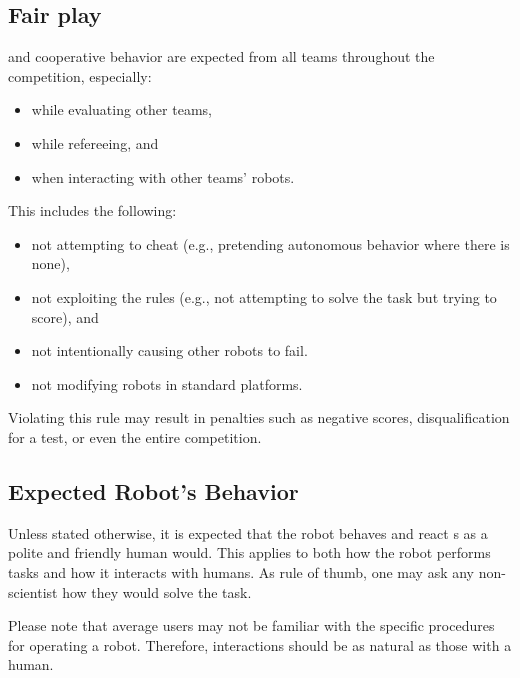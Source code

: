 \subsection{Fair play}\label{rule:fairplay}
 and cooperative behavior are expected from all teams throughout the competition, especially:
\begin{itemize}
	\item while evaluating other teams,
	\item while refereeing, and
	\item when interacting with other teams' robots.
\end{itemize}
This includes the following:
\begin{itemize}
	\item not attempting to cheat (e.g., pretending autonomous behavior where there is none),
	\item not exploiting the rules (e.g., not attempting to solve the task but trying to score), and
	\item not intentionally causing other robots to fail.
	\item not modifying robots in standard platforms.
\end{itemize}
Violating this rule may result in penalties such as negative scores, disqualification for a test, or even the entire competition.

\subsection{Expected Robot's Behavior}
Unless stated otherwise, it is expected that the robot behaves and react s as a polite and friendly human would.
This applies to both how the robot performs tasks and how it interacts with humans.
As rule of thumb, one may ask any non-scientist how they would solve the task.

Please note that average users may not be familiar with the specific procedures for operating a robot. Therefore, interactions should be as natural as those with a human.



